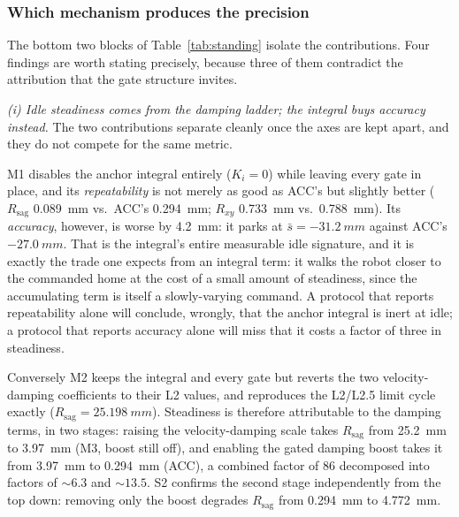 \documentclass[a4paper,fleqn]{cas-dc}
\begin{document}
\subsubsection{Which mechanism produces the precision}
\label{sec:idle_mechanism}

The bottom two blocks of Table~\ref{tab:standing} isolate the contributions. Four
findings are worth stating precisely, because three of them contradict the
attribution that the gate structure invites.

\emph{(i) Idle steadiness comes from the damping ladder; the integral buys
accuracy instead.} The two contributions separate cleanly once the axes are kept
apart, and they do not compete for the same metric.

M1 disables the anchor integral entirely ($K_i{=}0$) while leaving every gate in
place, and its \emph{repeatability} is not merely as good as ACC's but slightly
better ($R_{\text{sag}}$ \SI{0.089}{mm} vs.\ ACC's \SI{0.294}{mm};
$R_{xy}$ \SI{0.733}{mm} vs.\ \SI{0.788}{mm}). Its \emph{accuracy}, however, is
worse by \SI{4.2}{mm}: it parks at $\bar{s}={-}\SI{31.2}{mm}$ against ACC's
$-\SI{27.0}{mm}$. That is the integral's entire measurable idle signature, and it
is exactly the trade one expects from an integral term: it walks the robot closer to the commanded home at the cost of a small amount of steadiness, since
the accumulating term is itself a slowly-varying command. A protocol that reports
repeatability alone will conclude, wrongly, that the anchor integral is inert at
idle; a protocol that reports accuracy alone will miss that it costs a factor of
three in steadiness.

Conversely M2 keeps the integral and every gate but reverts the two
velocity-damping coefficients to their L2 values, and reproduces the L2/L2.5 limit
cycle exactly ($R_{\text{sag}}=\SI{25.198}{mm}$). Steadiness is therefore
attributable to the damping terms, in two stages: raising the velocity-damping
scale takes $R_{\text{sag}}$ from \SI{25.2}{mm} to \SI{3.97}{mm} (M3, boost still
off), and enabling the gated damping boost takes it from \SI{3.97}{mm} to
\SI{0.294}{mm} (ACC), a combined factor of \num{86} decomposed into factors of
${\sim}\num{6.3}$ and ${\sim}\num{13.5}$. S2 confirms the second stage
independently from the top down: removing only the boost degrades
$R_{\text{sag}}$ from \SI{0.294}{mm} to \SI{4.772}{mm}.
\end{document}
